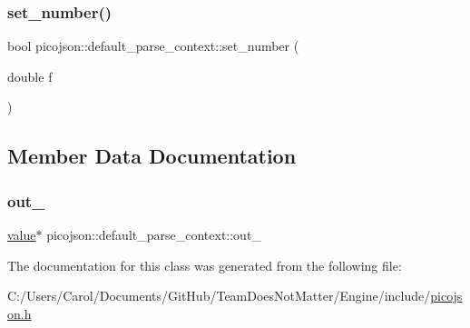 \hypertarget{classpicojson_1_1default__parse__context_a9b2046a9cb6d66aad835b84ffda20b86}{}\label{classpicojson_1_1default__parse__context_a9b2046a9cb6d66aad835b84ffda20b86} 
\subsubsection{\texorpdfstring{set\+\_\+number()}{set\_number()}}
{\footnotesize\ttfamily bool picojson\+::default\+\_\+parse\+\_\+context\+::set\+\_\+number (\begin{DoxyParamCaption}\item[{double}]{f }\end{DoxyParamCaption})\hspace{0.3cm}{\ttfamily [inline]}}



\subsection{Member Data Documentation}
\hypertarget{classpicojson_1_1default__parse__context_a89547d73da32e470068649e54646ff19}{}\label{classpicojson_1_1default__parse__context_a89547d73da32e470068649e54646ff19} 
\subsubsection{\texorpdfstring{out\+\_\+}{out\_}}
{\footnotesize\ttfamily \hyperlink{classpicojson_1_1value}{value}$\ast$ picojson\+::default\+\_\+parse\+\_\+context\+::out\+\_\+\hspace{0.3cm}{\ttfamily [protected]}}



The documentation for this class was generated from the following file\+:\begin{DoxyCompactItemize}
\item 
C\+:/\+Users/\+Carol/\+Documents/\+Git\+Hub/\+Team\+Does\+Not\+Matter/\+Engine/include/\hyperlink{picojson_8h}{picojson.\+h}\end{DoxyCompactItemize}
